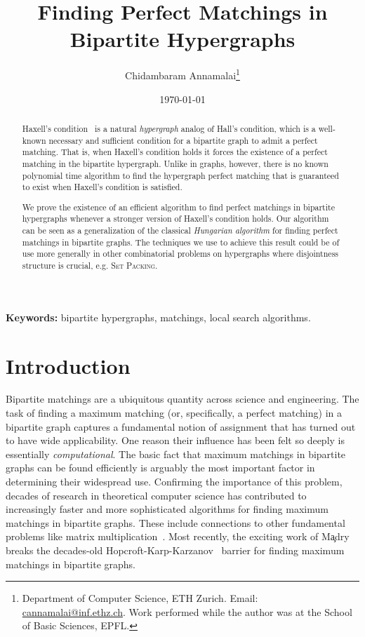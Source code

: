 \documentclass[11pt]{article}
\title{Finding Perfect Matchings in Bipartite Hypergraphs}
\author{Chidambaram Annamalai\thanks{Department of Computer Science,
    ETH Zurich. Email:
\href{mailto:cannamalai@inf.ethz.ch}{cannamalai@inf.ethz.ch}. \newline Work performed while the author was at the School of Basic Sciences, EPFL.}}
\date{\today}
\theoremstyle{definition}
\theoremstyle{remark}
\newcommand{\problemmacro}[1]{\texorpdfstring{\textsc{#1}}{#1}\xspace}
\newcommand{\draftbox}{\begin{center}
  \fbox{\begin{minipage}{2in}\begin{center}\Large\textsc{Working Draft}\\Please do not distribute\end{center}\end{minipage}}\end{center}
\vspace{0.2cm}}
\newcommand{\draftbox}{}
\begin{document}
\maketitle
\draftbox
\thispagestyle{empty}

\begin{abstract}
  Haxell's condition~\cite{haxell1995condition} is a natural \emph{hypergraph} analog of Hall's condition, which is a well-known necessary and sufficient condition for a bipartite graph to admit a perfect matching. That is, when Haxell's condition holds it forces the existence of a perfect matching in the bipartite hypergraph. Unlike in graphs, however, there is no known polynomial time algorithm to find the hypergraph perfect matching that is guaranteed to exist when Haxell's condition is satisfied.

We prove the existence of an efficient algorithm to find perfect matchings in bipartite hypergraphs whenever a stronger version of Haxell's condition holds. Our algorithm can be seen as a generalization of the classical \emph{Hungarian algorithm} for finding perfect matchings in bipartite graphs. The techniques we use to achieve this result could be of use more generally in other combinatorial problems on hypergraphs where disjointness structure is crucial, e.g. \problemmacro{Set Packing}.

 \end{abstract}

\medskip
\noindent
{\small \textbf{Keywords:}
bipartite hypergraphs, matchings, local search algorithms.
}

\newpage
\section{Introduction}
Bipartite matchings are a ubiquitous quantity across science and
engineering. The task of finding a maximum matching (or, specifically,
a perfect matching) in a bipartite graph captures a fundamental notion
of assignment that has turned out to have wide applicability. One
reason their influence has been felt so deeply is essentially
\emph{computational}. The basic fact that maximum matchings in
bipartite graphs can be found efficiently is arguably the most
important factor in determining their widespread use. Confirming the
importance of this problem, decades of research in theoretical
computer science has contributed to increasingly faster and more
sophisticated algorithms for finding maximum matchings in bipartite
graphs. These include connections to other fundamental problems like
matrix
multiplication~\cite{lovasz1979determinants,mucha2004maximum}. Most
recently, the exciting work of M\c{a}dry~\cite{madry2013navigating} breaks
the decades-old 
Hopcroft-Karp-Karzanov~\cite{hopcroft1973n,karzanov1973nakhozhdenii}
barrier for finding maximum matchings in bipartite graphs.
\end{document}
